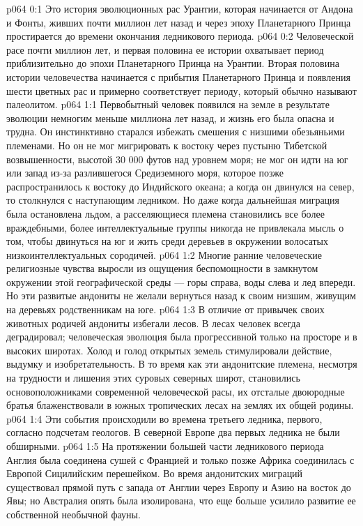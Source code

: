 \author{Носитель Жизни}
\vs p064 0:1 Это история эволюционных рас Урантии, которая начинается от Андона и Фонты, живших почти миллион лет назад и через эпоху Планетарного Принца простирается до времени окончания ледникового периода.
\vs p064 0:2 Человеческой расе почти миллион лет, и первая половина ее истории охватывает период приблизительно до эпохи Планетарного Принца на Урантии. Вторая половина истории человечества начинается с прибытия Планетарного Принца и появления шести цветных рас и примерно соответствует периоду, который обычно называют палеолитом.
\vs p064 1:1 Первобытный человек появился на земле в результате эволюции немногим меньше миллиона лет назад, и жизнь его была опасна и трудна. Он инстинктивно старался избежать смешения с низшими обезьяньими племенами. Но он не мог мигрировать к востоку через пустыню Тибетской возвышенности, высотой 30 000 футов над уровнем моря; не мог он идти на юг или запад из\hyp{}за разлившегося Средиземного моря, которое позже распространилось к востоку до Индийского океана; а когда он двинулся на север, то столкнулся с наступающим ледником. Но даже когда дальнейшая миграция была остановлена льдом, а расселяющиеся племена становились все более враждебными, более интеллектуальные группы никогда не привлекала мысль о том, чтобы двинуться на юг и жить среди деревьев в окружении волосатых низкоинтеллектуальных сородичей.
\vs p064 1:2 Многие ранние человеческие религиозные чувства выросли из ощущения беспомощности в замкнутом окружении этой географической среды --- горы справа, воды слева и лед впереди. Но эти развитые андониты не желали вернуться назад к своим низшим, живущим на деревьях родственникам на юге.
\vs p064 1:3 В отличие от привычек своих животных родичей андониты избегали лесов. В лесах человек всегда деградировал; человеческая эволюция была прогрессивной только на просторе и в высоких широтах. Холод и голод открытых земель стимулировали действие, выдумку и изобретательность. В то время как эти андонитские племена, несмотря на трудности и лишения этих суровых северных широт, становились основоположниками современной человеческой расы, их отсталые двоюродные братья блаженствовали в южных тропических лесах на землях их общей родины.
\vs p064 1:4 \pc Эти события происходили во времена третьего ледника, первого, согласно подсчетам геологов. В северной Европе два первых ледника не были обширными.
\vs p064 1:5 На протяжении большей части ледникового периода Англия была соединена сушей с Францией и только позже Африка соединилась с Европой Сицилийским перешейком. Во время андонитских миграций существовал прямой путь с запада от Англии через Европу и Азию на восток до Явы; но Австралия опять была изолирована, что еще больше усилило развитие ее собственной необычной фауны.
